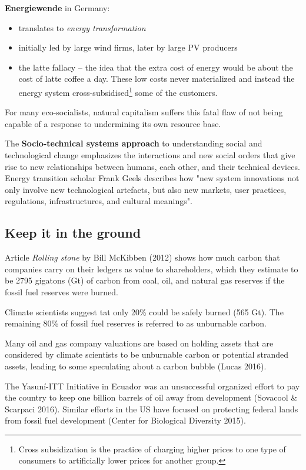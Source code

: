 \textbf{Energiewende} in Germany:
\begin{itemize}
	\item translates to \textit{energy transformation}
	\item initially led by large wind firms, later by large PV producers
	\item the latte fallacy -- the idea that the extra cost of energy would
	be about the cost of latte coffee a day. These low costs never
	materialized and instead the energy system cross-subsidised\footnote{
		Cross subsidization is the practice of charging higher prices
		to one type of consumers to artificially lower prices for
		another group.
	}
	some of the customers.
\end{itemize}

For many eco-socialists, natural capitalism suffers this fatal flaw of not
being capable of a response to undermining its own resource base.

The \textbf{Socio-technical systems approach} to understanding social and
technological change emphasizes the interactions and new social orders that
give rise to new relationships between humans, each other, and their technical
devices. Energy transition scholar Frank Geels describes how "new system
innovations not only involve new technological artefacts, but also new markets,
user practices, regulations, infrastructures, and cultural meanings".

\subsection{Keep it in the ground}
Article \textit{Rolling stone} by Bill McKibben (2012) shows how much carbon
that companies carry on their ledgers as value to shareholders, which they
estimate to be 2795 gigatons (Gt) of carbon from coal, oil, and natural gas
reserves if the fossil fuel reserves were burned.

Climate scientists suggest tat only 20\% could be safely burned (565 Gt). The
remaining 80\% of fossil fuel reserves is referred to as unburnable carbon.

Many oil and gas company valuations are based on holding assets that are
considered by climate scientists to be unburnable carbon or potential stranded
assets, leading to some speculating about a carbon bubble (Lucas 2016).

The Yasuní-ITT Initiative in Ecuador was an unsuccessful organized effort to
pay the country to keep one billion barrels of oil away from development
(Sovacool \& Scarpaci 2016). Similar efforts in the US have focused on
protecting federal lands from fossil fuel development (Center for Biological
Diversity 2015).

